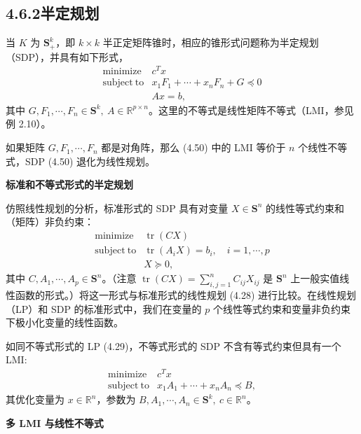 \documentclass[UTF8,12pt,a4paper,fontset=fandol]{ctexart}
\begin{document}
\subsection*{4.6.2\quad 半定规划}

当 $K$ 为 $\mathbf{S}_+^k$，即 $k\times k$ 半正定矩阵锥时，相应的锥形式问题称为半定规划（SDP），并具有如下形式，
\begin{equation}
\begin{array}{ll}
\mathop{\mathrm{minimize}} & c^Tx\\
\mathrm{subject\ to} & x_1F_1+\cdots+x_nF_n+G\preceq 0\\
& Ax=b,
\end{array}
\tag{4.50}
\end{equation}
其中 $G,F_1,\cdots,F_n\in\mathbf{S}^k,\ A\in\mathbb{R}^{p\times n}$。这里的不等式是线性矩阵不等式（LMI，参见例 2.10）。

如果矩阵 $G,F_1,\cdots,F_n$ 都是对角阵，那么 (4.50) 中的 LMI 等价于 $n$ 个线性不等式，SDP (4.50) 退化为线性规划。

\noindent\textbf{标准和不等式形式的半定规划}

仿照线性规划的分析，标准形式的 SDP 具有对变量 $X\in\mathbf{S}^n$ 的线性等式约束和（矩阵）非负约束：
\begin{equation}
\begin{array}{ll}
\mathop{\mathrm{minimize}} & \operatorname{tr}(CX)\\
\mathrm{subject\ to} & \operatorname{tr}(A_iX)=b_i,\quad i=1,\cdots,p\\
& X\succeq 0,
\end{array}
\tag{4.51}
\end{equation}
其中 $C,A_1,\cdots,A_p\in\mathbf{S}^n$。（注意 $\operatorname{tr}(CX)=\sum_{i,j=1}^n C_{ij}X_{ij}$ 是 $\mathbf{S}^n$ 上一般实值线性函数的形式。）将这一形式与标准形式的线性规划 (4.28) 进行比较。在线性规划（LP）和 SDP 的标准形式中，我们在变量的 $p$ 个线性等式约束和变量非负约束下极小化变量的线性函数。

如同不等式形式的 LP (4.29)，不等式形式的 SDP 不含有等式约束但具有一个 LMI:
\[
\begin{array}{ll}
\mathop{\mathrm{minimize}} & c^Tx\\
\mathrm{subject\ to} & x_1A_1+\cdots+x_nA_n\preceq B,
\end{array}
\]
其优化变量为 $x\in\mathbb{R}^n$，参数为 $B,A_1,\cdots,A_n\in\mathbf{S}^k,\ c\in\mathbb{R}^n$。

\noindent\textbf{多 LMI 与线性不等式}
\end{document}
